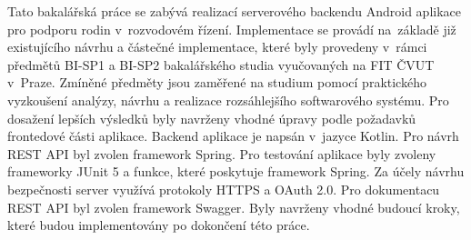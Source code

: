 %
%
Tato bakalářská práce se zabývá realizací serverového backendu Android aplikace pro podporu rodin v~rozvodovém řízení. Implementace se provádí na~základě již existujícího návrhu a částečné implementace, které byly provedeny v~rámci předmětů BI-SP1 a BI-SP2 bakalářského studia vyučovaných na FIT ČVUT v~Praze. Zmíněné předměty jsou zaměřené na studium pomocí praktického vyzkoušení analýzy, návrhu a realizace rozsáhlejšího softwarového systému. Pro dosažení lepších výsledků byly navrženy vhodné úpravy podle požadavků frontedové části aplikace. Backend aplikace je napsán v~jazyce Kotlin. Pro návrh REST API byl zvolen framework Spring. Pro testování aplikace byly zvoleny frameworky JUnit 5 a funkce, které poskytuje framework Spring. Za účely návrhu bezpečnosti server využívá protokoly HTTPS a OAuth 2.0. Pro dokumentacu REST API byl zvolen framework Swagger. Byly navrženy vhodné budoucí kroky, které budou implementovány po dokončení této práce.